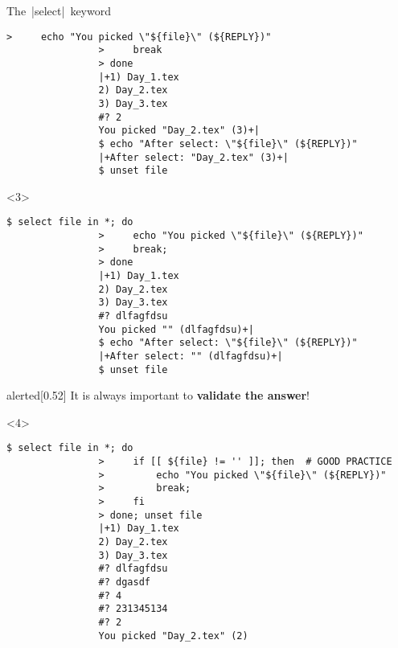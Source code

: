 \begin{frame}[fragile]{The \,\bash|select|\, keyword}
\begin{overlayarea}{\textwidth}{\textheight}
\begin{onlyenv}
\begin{lstlisting}[style=MyBash]
                >     echo "You picked \"${file}\" (${REPLY})"
                >     break
                > done
                |+1) Day_1.tex
                2) Day_2.tex
                3) Day_3.tex
                #? 2
                You picked "Day_2.tex" (3)+|
                $ echo "After select: \"${file}\" (${REPLY})"
                |+After select: "Day_2.tex" (3)+|
                $ unset file
            \end{lstlisting}
        \end{onlyenv}
        \begin{onlyenv}<3>
            \begin{lstlisting}[style=MyBash]
                $ select file in *; do
                >     echo "You picked \"${file}\" (${REPLY})"
                >     break;
                > done
                |+1) Day_1.tex
                2) Day_2.tex
                3) Day_3.tex
                #? dlfagfdsu
                You picked "" (dlfagfdsu)+|
                $ echo "After select: \"${file}\" (${REPLY})"
                |+After select: "" (dlfagfdsu)+|
                $ unset file
            \end{lstlisting}
            \medskip
            \begin{varblock}{alerted}[0.52\textwidth]{}
                It is always important to \alert{\textbf{validate the answer}}!
            \end{varblock}
        \end{onlyenv}
        \begin{onlyenv}<4>
            \begin{lstlisting}[style=MyBash]
                $ select file in *; do
                >     if [[ ${file} != '' ]]; then  # GOOD PRACTICE
                >         echo "You picked \"${file}\" (${REPLY})"
                >         break;
                >     fi
                > done; unset file
                |+1) Day_1.tex
                2) Day_2.tex
                3) Day_3.tex
                #? dlfagfdsu
                #? dgasdf
                #? 4
                #? 231345134
                #? 2
                You picked "Day_2.tex" (2)
            \end{lstlisting}
        \end{onlyenv}
    \end{overlayarea}
\end{frame}




















